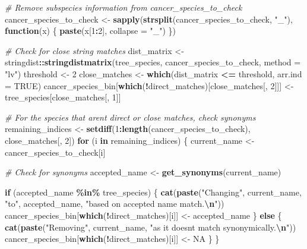 \documentclass[
]{article}
\newenvironment{Shaded}{\begin{snugshade}}{\end{snugshade}}
\newcommand{\AttributeTok}[1]{\textcolor[rgb]{0.13,0.29,0.53}{#1}}
\newcommand{\CommentTok}[1]{\textcolor[rgb]{0.56,0.35,0.01}{\textit{#1}}}
\newcommand{\ConstantTok}[1]{\textcolor[rgb]{0.56,0.35,0.01}{#1}}
\newcommand{\ControlFlowTok}[1]{\textcolor[rgb]{0.13,0.29,0.53}{\textbf{#1}}}
\newcommand{\DecValTok}[1]{\textcolor[rgb]{0.00,0.00,0.81}{#1}}
\newcommand{\FunctionTok}[1]{\textcolor[rgb]{0.13,0.29,0.53}{\textbf{#1}}}
\newcommand{\NormalTok}[1]{#1}
\newcommand{\OtherTok}[1]{\textcolor[rgb]{0.56,0.35,0.01}{#1}}
\newcommand{\SpecialCharTok}[1]{\textcolor[rgb]{0.81,0.36,0.00}{\textbf{#1}}}
\newcommand{\StringTok}[1]{\textcolor[rgb]{0.31,0.60,0.02}{#1}}
\begin{document}
\begin{Shaded}
\begin{Highlighting}[]
\CommentTok{\# Remove subspecies information from cancer\_species\_to\_check}
\NormalTok{cancer\_species\_to\_check }\OtherTok{\textless{}{-}} \FunctionTok{sapply}\NormalTok{(}\FunctionTok{strsplit}\NormalTok{(cancer\_species\_to\_check, }\StringTok{"\_"}\NormalTok{), }\ControlFlowTok{function}\NormalTok{(x) \{}
  \FunctionTok{paste}\NormalTok{(x[}\DecValTok{1}\SpecialCharTok{:}\DecValTok{2}\NormalTok{], }\AttributeTok{collapse =} \StringTok{"\_"}\NormalTok{)}
\NormalTok{\})}


\CommentTok{\# Check for close string matches}
\NormalTok{dist\_matrix }\OtherTok{\textless{}{-}}\NormalTok{ stringdist}\SpecialCharTok{::}\FunctionTok{stringdistmatrix}\NormalTok{(tree\_species, cancer\_species\_to\_check, }\AttributeTok{method =} \StringTok{"lv"}\NormalTok{)}
\NormalTok{threshold }\OtherTok{\textless{}{-}} \DecValTok{2}
\NormalTok{close\_matches }\OtherTok{\textless{}{-}} \FunctionTok{which}\NormalTok{(dist\_matrix }\SpecialCharTok{\textless{}=}\NormalTok{ threshold, }\AttributeTok{arr.ind =} \ConstantTok{TRUE}\NormalTok{)}
\NormalTok{cancer\_species\_bin[}\FunctionTok{which}\NormalTok{(}\SpecialCharTok{!}\NormalTok{direct\_matches)[close\_matches[, }\DecValTok{2}\NormalTok{]]] }\OtherTok{\textless{}{-}}\NormalTok{ tree\_species[close\_matches[, }\DecValTok{1}\NormalTok{]]}

\CommentTok{\# For the species that aren\textquotesingle{}t direct or close matches, check synonyms}
\NormalTok{remaining\_indices }\OtherTok{\textless{}{-}} \FunctionTok{setdiff}\NormalTok{(}\DecValTok{1}\SpecialCharTok{:}\FunctionTok{length}\NormalTok{(cancer\_species\_to\_check), close\_matches[, }\DecValTok{2}\NormalTok{])}
\ControlFlowTok{for}\NormalTok{ (i }\ControlFlowTok{in}\NormalTok{ remaining\_indices) \{}
\NormalTok{  current\_name }\OtherTok{\textless{}{-}}\NormalTok{ cancer\_species\_to\_check[i]}
  
  \CommentTok{\# Check for synonyms}
\NormalTok{  accepted\_name }\OtherTok{\textless{}{-}} \FunctionTok{get\_synonyms}\NormalTok{(current\_name)}
  
  \ControlFlowTok{if}\NormalTok{ (accepted\_name }\SpecialCharTok{\%in\%}\NormalTok{ tree\_species) \{}
    \FunctionTok{cat}\NormalTok{(}\FunctionTok{paste}\NormalTok{(}\StringTok{"Changing"}\NormalTok{, current\_name, }\StringTok{"to"}\NormalTok{, accepted\_name, }\StringTok{"based on accepted name match.}\SpecialCharTok{\textbackslash{}n}\StringTok{"}\NormalTok{))}
\NormalTok{    cancer\_species\_bin[}\FunctionTok{which}\NormalTok{(}\SpecialCharTok{!}\NormalTok{direct\_matches)[i]] }\OtherTok{\textless{}{-}}\NormalTok{ accepted\_name}
\NormalTok{  \} }\ControlFlowTok{else}\NormalTok{ \{}
    \FunctionTok{cat}\NormalTok{(}\FunctionTok{paste}\NormalTok{(}\StringTok{"Removing"}\NormalTok{, current\_name, }\StringTok{"as it doesn\textquotesingle{}t match synonymically.}\SpecialCharTok{\textbackslash{}n}\StringTok{"}\NormalTok{))}
\NormalTok{    cancer\_species\_bin[}\FunctionTok{which}\NormalTok{(}\SpecialCharTok{!}\NormalTok{direct\_matches)[i]] }\OtherTok{\textless{}{-}} \ConstantTok{NA}
\NormalTok{  \}}
\NormalTok{\}}
\end{Highlighting}
\end{Shaded}
\end{document}
